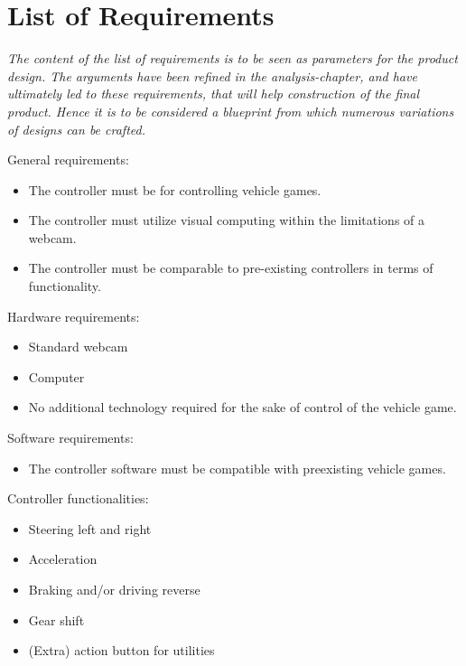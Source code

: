 \section{List of Requirements}
\label{LOR}

\textit{The content of the list of requirements is to be seen as parameters for the product design. The arguments have been refined in the analysis-chapter, and have ultimately led to these requirements, that will help construction of the final product. Hence it is to be considered a blueprint from which numerous variations of designs can be crafted.}
\bigskip

General requirements:
\begin{itemize}
\item The controller must be for controlling vehicle games.
\item The controller must utilize visual computing within the limitations of a webcam.
\item The controller must be comparable to pre-existing controllers in terms of functionality.
\end{itemize}
Hardware requirements:
\begin{itemize}
\item Standard webcam
\item Computer
\item No additional technology required for the sake of control of the vehicle game.
\end{itemize}
Software requirements:
\begin{itemize}
\item The controller software must be compatible with preexisting vehicle games.
\end{itemize}
Controller functionalities:
\begin{itemize}
\item Steering left and right
\item Acceleration
\item Braking and/or driving reverse
\item Gear shift
\item (Extra) action button for utilities 
\end{itemize}